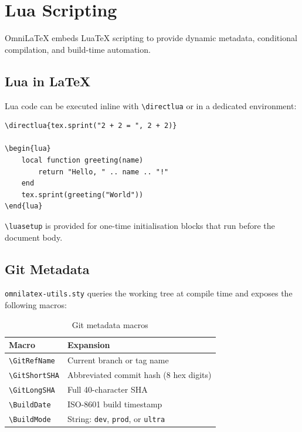 \chapter{Lua Scripting}
\label{ch:lua-scripting}

OmniLaTeX embeds Lua\TeX{} scripting to provide dynamic metadata,
conditional compilation, and build-time automation.

\section{Lua in \LaTeX}

Lua code can be executed inline with \texttt{\textbackslash directlua} or
in a dedicated environment:

\begin{verbatim}
\directlua{tex.sprint("2 + 2 = ", 2 + 2)}

\begin{lua}
    local function greeting(name)
        return "Hello, " .. name .. "!"
    end
    tex.sprint(greeting("World"))
\end{lua}
\end{verbatim}

\texttt{\textbackslash luasetup} is provided for one-time initialisation
blocks that run before the document body.

\section{Git Metadata}

\texttt{omnilatex-utils.sty} queries the working tree at compile time and
exposes the following macros:

\begin{table}[htbp]
    \centering
    \caption{Git metadata macros}
    \label{tab:git-macros}
    \begin{tabular}{@{} l p{7cm} @{}}
        \toprule
        \textbf{Macro} & \textbf{Expansion} \\
        \midrule
        \verb|\GitRefName|   & Current branch or tag name \\
        \verb|\GitShortSHA|  & Abbreviated commit hash (8 hex digits) \\
        \verb|\GitLongSHA|   & Full 40-character SHA \\
        \verb|\BuildDate|    & ISO-8601 build timestamp \\
        \verb|\BuildMode|    & String: \texttt{dev}, \texttt{prod}, or
                               \texttt{ultra} \\
        \bottomrule
    \end{tabular}
\end{table}

